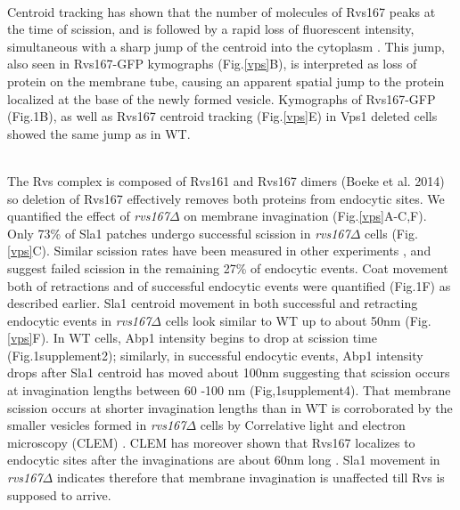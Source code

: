 \documentclass[9pt,lineno]{elife}
\begin{document}
~\\
Centroid tracking has shown that the number of molecules of Rvs167 peaks at the time of  scission, and is followed by a rapid loss of fluorescent intensity, simultaneous with a sharp jump of the centroid into the cytoplasm \citep{Picco2015}. This jump, also seen in Rvs167-GFP kymographs (Fig.\ref{vps}B), is interpreted as loss of protein on the membrane tube, causing an apparent spatial jump to the protein localized at the base of the newly formed vesicle. Kymographs of Rvs167-GFP (Fig.1B), as well as Rvs167 centroid tracking (Fig.\ref{vps}E) in Vps1 deleted cells showed the same jump as in WT. 

~\\
The Rvs complex is composed of Rvs161 and Rvs167 dimers (Boeke et al. 2014) so deletion of Rvs167 effectively removes both proteins from endocytic sites. We quantified the effect of \textit{rvs167$\Delta$}  on membrane invagination (Fig.\ref{vps}A-C,F). Only 73\% of Sla1 patches undergo successful scission in \textit{rvs167$\Delta$}  cells (Fig.\ref{vps}C). Similar scission rates have been measured in other experiments \citep{Kaksonen2005}, and suggest failed scission in the remaining 27\% of endocytic events. Coat movement both of retractions and of successful endocytic events were quantified (Fig.1F) as described earlier. Sla1 centroid movement in both successful and retracting endocytic events in \textit{rvs167$\Delta$}  cells look similar to WT up to about 50nm (Fig.\ref{vps}F). In WT cells, Abp1 intensity begins to drop at scission time (Fig.1supplement2); similarly, in successful endocytic events, Abp1 intensity drops after Sla1 centroid has moved about 100nm suggesting that scission occurs at invagination lengths between 60 -100 nm (Fig,1supplement4). That membrane scission occurs at shorter invagination lengths than in WT is corroborated  by the smaller vesicles formed in \textit{rvs167$\Delta$}  cells by Correlative light and electron microscopy (CLEM) \citep{Kukulski2012}. CLEM has moreover shown that Rvs167 localizes to endocytic sites after the invaginations are about 60nm long \citep{Kukulski2012}. Sla1 movement in \textit{rvs167$\Delta$} indicates therefore that membrane invagination is unaffected till Rvs is supposed to arrive. 


\end{document}
